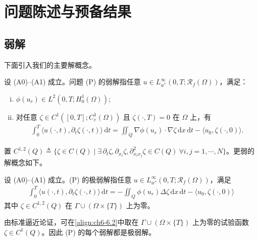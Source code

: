 \documentclass[../../main.tex]{subfiles}%
\begin{document}
\section{问题陈述与预备结果}\label{section:ch06-问题陈述}

\subsection{弱解}\label{subsection:ch06-弱解}

下面引入我们的主要解概念。

\begin{definition}\label{definition:ch06-弱解}
设 (A0)--(A1) 成立。问题 (P) 的弱解指任意 $u\in L^\infty_{w^*}(0,T;\mathscr{R}_f(\Omega))$，满足：
\begin{enumerate}[(i)]
\item $\phi(u_r)\in L^2(0,T;H^1_0(\Omega))$;
\item 对任意 $\zeta\in C^1([0,T];C^1_c(\Omega))$ 且 $\zeta(\cdot,T)=0$ 在 $\Omega$ 上，有
\begin{align}
\int_0^T\langle u(\cdot,t),\partial_t\zeta(\cdot,t)\rangle\,\mathrm{d}t
= \iint_Q\nabla\phi(u_r)\cdot\nabla\zeta\,\mathrm{d}x\,\mathrm{d}t
-\langle u_0,\zeta(\cdot,0)\rangle. \label{align:ch6-6.2}
\end{align}
\end{enumerate}
\end{definition}

置 $C^{1,2}(Q)\triangleq \{\zeta\in C(Q)\mid\exists\,\partial_t\zeta,\partial_{x_i}\zeta,\partial^2_{x_ix_j}\zeta\in C(Q)\ \forall i,j=1,\cdots ,N\}$。更弱的解概念如下。

\begin{definition}\label{definition:ch06-极弱解}
设 (A0)--(A1) 成立。(P) 的极弱解指任意 $u\in L^\infty_{w^*}(0,T;\mathscr{R}_f(\Omega))$，满足
\begin{align}
\int_0^T\langle u(\cdot,t),\partial_t\zeta(\cdot,t)\rangle\,\mathrm{d}t
= -\iint_Q\phi(u_r)\Delta\zeta\,\mathrm{d}x\,\mathrm{d}t
-\langle u_0,\zeta(\cdot,0)\rangle \label{align:ch6-6.3}
\end{align}
其中 $\zeta\in C^{1,2}(Q)$ 在 $\Gamma\cup(\Omega\times\{T\})$ 上为零。
\end{definition}

\begin{remark}\label{remark:ch06-6.1.1}
由标准逼近论证，可在\eqref{align:ch6-6.2}中取在 $\Gamma\cup(\Omega\times\{T\})$ 上为零的试验函数 $\zeta\in C^1(Q)$。因此 (P) 的每个弱解都是极弱解。
\end{remark}
\end{document}
